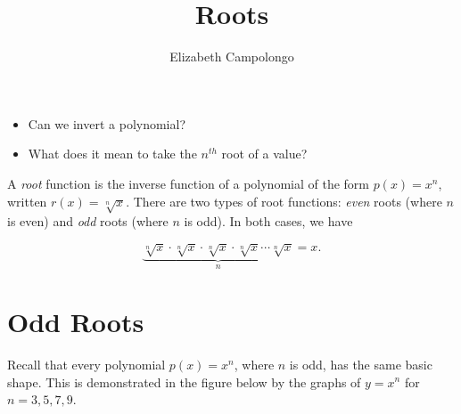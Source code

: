 \documentclass{ximera}
\author{Elizabeth Campolongo}
\title{Roots}
\begin{document}
\begin{abstract}
  
\end{abstract}
\maketitle

\begin{motivatingQuestions}\begin{itemize}
\item Can we invert a polynomial?
\item What does it mean to take the $n^{th}$ root of a value?
\end{itemize}\end{motivatingQuestions}




A {\em root} function is the inverse function of a polynomial of the form $p(x)=x^n$, written $r(x)=\sqrt[n]{x}$. There are two types of root functions: {\em even} roots (where $n$ is even) and {\em odd} roots (where $n$ is odd). In both cases, we have

$$\underbrace{\sqrt[n]{x} \cdot \sqrt[n]{x} \cdot \sqrt[n]{x} \cdot \sqrt[n]{x} \cdots \sqrt[n]{x}}_n =x.$$

\section{Odd Roots}

Recall that every polynomial $p(x) = x^n$, where $n$ is odd, has the same basic shape. This is demonstrated in the figure below by the graphs of $y = x^n$ for $n = 3, 5,7,9$.
\end{document}
